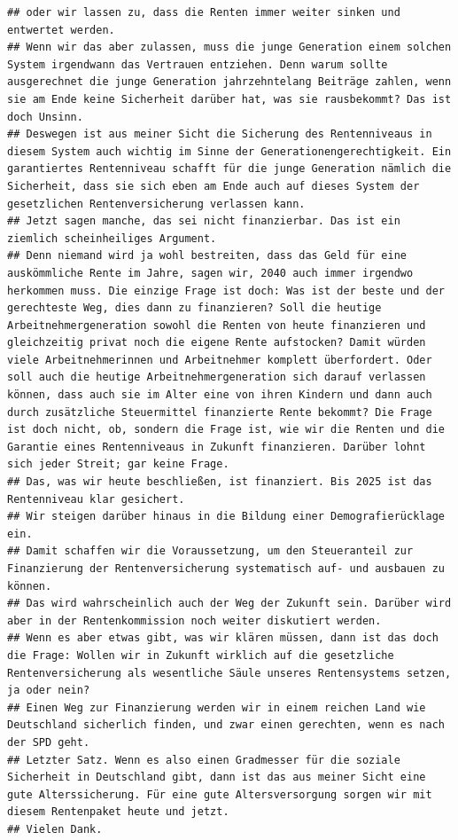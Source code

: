 \documentclass[oneside, 12pt]{scrbook}
\theoremstyle{definition}
\theoremstyle{definition}
\theoremstyle{definition}
\theoremstyle{remark}
\begin{document}
\begin{verbatim}
## oder wir lassen zu, dass die Renten immer weiter sinken und entwertet werden. 
## Wenn wir das aber zulassen, muss die junge Generation einem solchen System irgendwann das Vertrauen entziehen. Denn warum sollte ausgerechnet die junge Generation jahrzehntelang Beiträge zahlen, wenn sie am Ende keine Sicherheit darüber hat, was sie rausbekommt? Das ist doch Unsinn. 
## Deswegen ist aus meiner Sicht die Sicherung des Rentenniveaus in diesem System auch wichtig im Sinne der Generationengerechtigkeit. Ein garantiertes Rentenniveau schafft für die junge Generation nämlich die Sicherheit, dass sie sich eben am Ende auch auf dieses System der gesetzlichen Rentenversicherung verlassen kann. 
## Jetzt sagen manche, das sei nicht finanzierbar. Das ist ein ziemlich scheinheiliges Argument. 
## Denn niemand wird ja wohl bestreiten, dass das Geld für eine auskömmliche Rente im Jahre, sagen wir, 2040 auch immer irgendwo herkommen muss. Die einzige Frage ist doch: Was ist der beste und der gerechteste Weg, dies dann zu finanzieren? Soll die heutige Arbeitnehmergeneration sowohl die Renten von heute finanzieren und gleichzeitig privat noch die eigene Rente aufstocken? Damit würden viele Arbeitnehmerinnen und Arbeitnehmer komplett überfordert. Oder soll auch die heutige Arbeitnehmergeneration sich darauf verlassen können, dass auch sie im Alter eine von ihren Kindern und dann auch durch zusätzliche Steuermittel finanzierte Rente bekommt? Die Frage ist doch nicht, ob, sondern die Frage ist, wie wir die Renten und die Garantie eines Rentenniveaus in Zukunft finanzieren. Darüber lohnt sich jeder Streit; gar keine Frage. 
## Das, was wir heute beschließen, ist finanziert. Bis 2025 ist das Rentenniveau klar gesichert. 
## Wir steigen darüber hinaus in die Bildung einer Demografierücklage ein. 
## Damit schaffen wir die Voraussetzung, um den Steueranteil zur Finanzierung der Rentenversicherung systematisch auf- und ausbauen zu können. 
## Das wird wahrscheinlich auch der Weg der Zukunft sein. Darüber wird aber in der Rentenkommission noch weiter diskutiert werden. 
## Wenn es aber etwas gibt, was wir klären müssen, dann ist das doch die Frage: Wollen wir in Zukunft wirklich auf die gesetzliche Rentenversicherung als wesentliche Säule unseres Rentensystems setzen, ja oder nein? 
## Einen Weg zur Finanzierung werden wir in einem reichen Land wie Deutschland sicherlich finden, und zwar einen gerechten, wenn es nach der SPD geht. 
## Letzter Satz. Wenn es also einen Gradmesser für die soziale Sicherheit in Deutschland gibt, dann ist das aus meiner Sicht eine gute Alterssicherung. Für eine gute Altersversorgung sorgen wir mit diesem Rentenpaket heute und jetzt. 
## Vielen Dank.
\end{verbatim}
\end{document}
